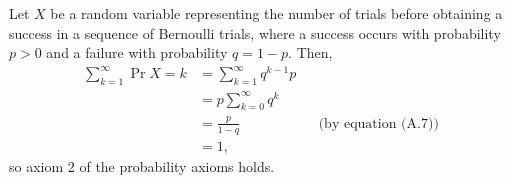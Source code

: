 Let $X$ be a random variable representing the number of trials before obtaining a success in a sequence of Bernoulli trials, where a success occurs with probability $p>0$ and a failure with probability $q=1-p$.
Then,
\begin{align*}
    \sum_{k=1}^\infty\Pr{X=k} &= \sum_{k=1}^\infty q^{k-1}p \\
    &= p\sum_{k=0}^\infty q^k \\
    &= \frac{p}{1-q} && \text{(by equation (A.7))} \\[1mm]
    &= 1,
\end{align*}
so axiom 2 of the probability axioms holds.
